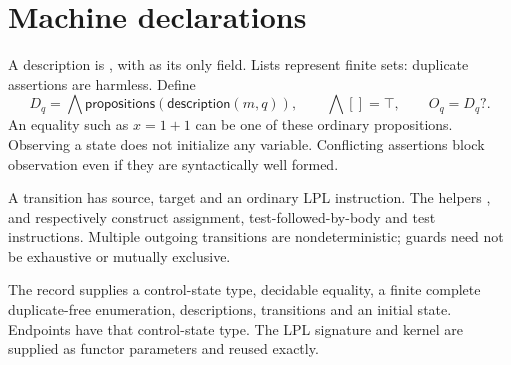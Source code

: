 \section{Machine declarations}\label{sec:declarations}
A description is , with
 as its only field. Lists represent finite
sets: duplicate assertions are harmless. Define
\[
 D_q=\bigwedge\mathsf{propositions}(\mathsf{description}(m,q)),
 \qquad \bigwedge[]=\top,\qquad O_q=D_q?.
\]
An equality such as $x=1+1$ can be one of these ordinary propositions.
Observing a state does not initialize any variable. Conflicting assertions
block observation even if they are syntactically well formed.

A transition has source, target and an ordinary LPL instruction. The helpers
,  and  respectively
construct assignment, test-followed-by-body and test instructions. Multiple
outgoing transitions are nondeterministic; guards need not be exhaustive
or mutually exclusive.

The  record supplies a control-state type, decidable equality, a
finite complete duplicate-free enumeration, descriptions, transitions and
an initial state. Endpoints have that control-state type. The LPL signature
and kernel are supplied as functor parameters and reused exactly.
